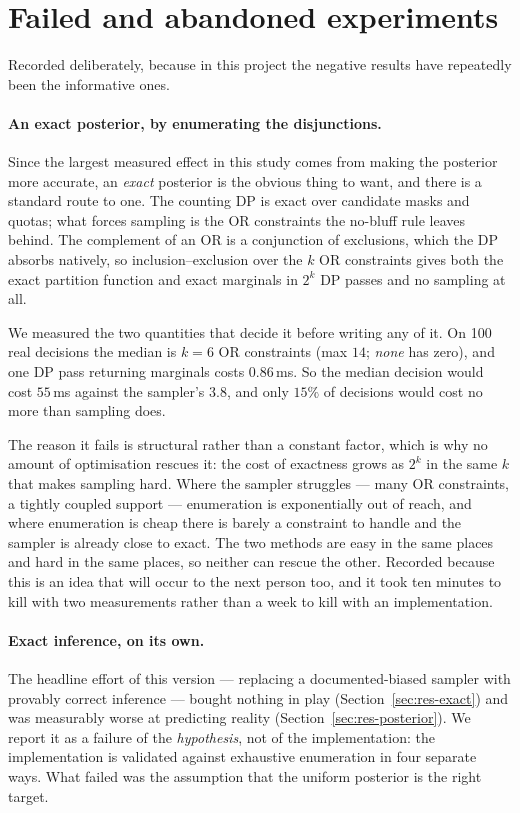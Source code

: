 \documentclass[11pt,a4paper]{article}
\begin{document}
\section{Failed and abandoned experiments}
\label{sec:failures}

Recorded deliberately, because in this project the negative results have
repeatedly been the informative ones.

\paragraph{An exact posterior, by enumerating the disjunctions.} Since the
largest measured effect in this study comes from making the posterior more
accurate, an \emph{exact} posterior is the obvious thing to want, and there is a
standard route to one. The counting DP is exact over candidate masks and quotas;
what forces sampling is the OR constraints the no-bluff rule leaves behind. The
complement of an OR is a conjunction of exclusions, which the DP absorbs
natively, so inclusion--exclusion over the $k$ OR constraints gives both the
exact partition function and exact marginals in $2^k$ DP passes and no sampling
at all.

We measured the two quantities that decide it before writing any of it. On 100
real decisions the median is $k = 6$ OR constraints (max $14$; \emph{none} has
zero), and one DP pass returning marginals costs $0.86$\,ms. So the median
decision would cost $55$\,ms against the sampler's $3.8$, and only $15\%$ of
decisions would cost no more than sampling does.

The reason it fails is structural rather than a constant factor, which is why no
amount of optimisation rescues it: the cost of exactness grows as $2^k$ in the
same $k$ that makes sampling hard. Where the sampler struggles --- many OR
constraints, a tightly coupled support --- enumeration is exponentially out of
reach, and where enumeration is cheap there is barely a constraint to handle and
the sampler is already close to exact. The two methods are easy in the same
places and hard in the same places, so neither can rescue the other. Recorded
because this is an idea that will occur to the next person too, and it took ten
minutes to kill with two measurements rather than a week to kill with an
implementation.

\paragraph{Exact inference, on its own.} The headline effort of this version ---
replacing a documented-biased sampler with provably correct inference --- bought
nothing in play (Section~\ref{sec:res-exact}) and was measurably worse at
predicting reality (Section~\ref{sec:res-posterior}). We report it as a failure
of the \emph{hypothesis}, not of the implementation: the implementation is
validated against exhaustive enumeration in four separate ways. What failed was
the assumption that the uniform posterior is the right target.
\end{document}
